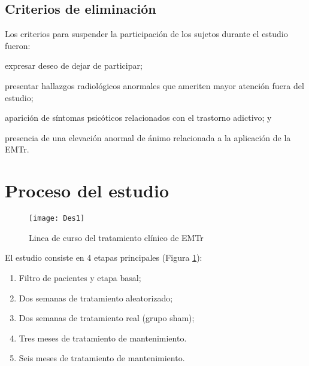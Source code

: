 \subsection{Criterios de eliminación}
Los criterios para suspender la participación de los sujetos durante el estudio fueron:
\begin{enumerate*}[label=\emph{\alph*})]
    \item expresar deseo de dejar de participar;
    \item presentar hallazgos radiológicos anormales que ameriten mayor atención fuera del estudio;
    \item aparición de síntomas psicóticos relacionados con el trastorno adictivo; y
    \item presencia de una elevación anormal de ánimo relacionada a la aplicación de la EMTr.
\end{enumerate*}

\section{Proceso del estudio}
\begin{figure}[h]
    \centering
    \texttt{[image: Des1]}
    \caption{Linea de curso del tratamiento clínico de EMTr}
    \label{fig:txTMS}
\end{figure}

El estudio consiste en 4 etapas principales (Figura \ref{fig:txTMS}):
\begin{enumerate}[start=0,leftmargin=3\parindent,align=left,label=Etapa \arabic*:]
    \item Filtro de pacientes y etapa basal;
    \item Dos semanas de tratamiento aleatorizado;
    \item[Etapa 1-4:] Dos semanas de tratamiento real (grupo sham);
    \item Tres meses de tratamiento de mantenimiento.
    \item Seis meses de tratamiento de mantenimiento.
\end{enumerate}

